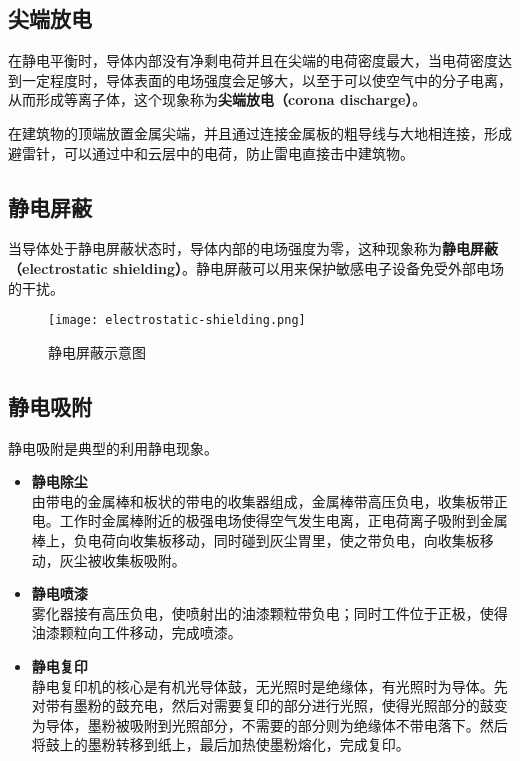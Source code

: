 \documentclass[lang=cn,newtx,10pt,scheme=chinese]{elegantbook}
\begin{document}
\subsection{尖端放电}

在静电平衡时，导体内部没有净剩电荷并且在尖端的电荷密度最大，当电荷密度达到一定程度时，导体表面的电场强度会足够大，以至于可以使空气中的分子电离，从而形成等离子体，这个现象称为\textbf{尖端放电（corona discharge）}。

在建筑物的顶端放置金属尖端，并且通过连接金属板的粗导线与大地相连接，形成避雷针，可以通过中和云层中的电荷，防止雷电直接击中建筑物。

\subsection{静电屏蔽}

当导体处于静电屏蔽状态时，导体内部的电场强度为零，这种现象称为\textbf{静电屏蔽（electrostatic shielding）}。静电屏蔽可以用来保护敏感电子设备免受外部电场的干扰。

\begin{figure}[htbp]
  \centering
  \texttt{[image: electrostatic-shielding.png]}
  \caption{静电屏蔽示意图}
  \label{fig:electrostatic-shielding}
\end{figure}

\subsection{静电吸附}

静电吸附是典型的利用静电现象。

\begin{itemize}
  \item \textbf{静电除尘}\\
    由带电的金属棒和板状的带电的收集器组成，金属棒带高压负电，收集板带正电。工作时金属棒附近的极强电场使得空气发生电离，正电荷离子吸附到金属棒上，负电荷向收集板移动，同时碰到灰尘胃里，使之带负电，向收集板移动，灰尘被收集板吸附。
  \item \textbf{静电喷漆}\\
    雾化器接有高压负电，使喷射出的油漆颗粒带负电；同时工件位于正极，使得油漆颗粒向工件移动，完成喷漆。
  \item \textbf{静电复印}\\
    静电复印机的核心是有机光导体鼓，无光照时是绝缘体，有光照时为导体。先对带有墨粉的鼓充电，然后对需要复印的部分进行光照，使得光照部分的鼓变为导体，墨粉被吸附到光照部分，不需要的部分则为绝缘体不带电落下。然后将鼓上的墨粉转移到纸上，最后加热使墨粉熔化，完成复印。
\end{itemize}
\end{document}
